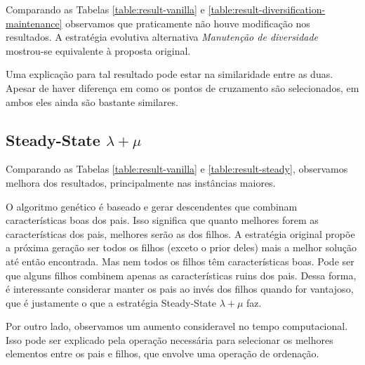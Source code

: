\documentclass[11pt]{article}
\begin{document}
Comparando as Tabelas \ref{table:result-vanilla} e \ref{table:result-diversification-maintenance} observamos que praticamente não houve modificação nos resultados. A estratégia evolutiva alternativa \textit{Manutenção de diversidade} mostrou-se equivalente à proposta original.

Uma explicação para tal resultado pode estar na similaridade entre as duas. Apesar de haver diferença em como os pontos de cruzamento são selecionados, em ambos eles ainda são bastante similares.


\subsection{Steady-State $\lambda +	\mu$}

Comparando as Tabelas \ref{table:result-vanilla} e \ref{table:result-steady}, observamos melhora dos resultados, principalmente nas instâncias maiores.

O algoritmo genético é baseado e gerar descendentes que combinam características boas dos pais. Isso significa que quanto melhores forem as características dos pais, melhores serão as dos filhos. A estratégia original propõe a próxima geração ser todos os filhos (exceto o prior deles) mais a melhor solução até então encontrada. Mas nem todos os filhos têm características boas. Pode ser que alguns filhos combinem apenas as características ruins dos pais. Dessa forma, é interessante considerar manter os pais ao invés dos filhos quando for vantajoso, que é justamente o que a estratégia Steady-State $\lambda +	\mu$ faz.

Por outro lado, observamos um aumento consideravel no tempo computacional. Isso pode ser explicado pela operação necessária para selecionar os melhores elementos entre os pais e filhos, que envolve uma operação de ordenação.



\end{document}
